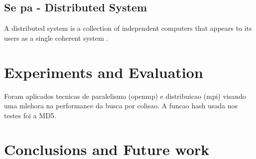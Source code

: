 \documentclass[12pt]{article}
\begin{document}
\subsection{Se pa - Distributed System}
A distributed system is a collection of independent computers that appears to its users as a single 
coherent system \cite{tanenbaum2002distributed}.

\iffalse
\subsection{Message Integrity}

Message integrity is normally maintained via the protocol called “MAC" or Message Authentication Code. 
To briefly explain its mechanism,

In the digital world, the techniques for transmission and integrity assurance of messages are in constant
evolution, aiming more efficient and secure protocols. A protocol's security can be threatened by inumerous
different ways, some possibly unknown yet, and requires a reasonable time of study, tests and attacks
to be considered for use in real applications.

O protocolo de autenticacao HMAC pode ser entendido em detalhes em \cite{krawczyk1997hmac}, mas como uma breve
introducao, consideremos o seguinte exemplo: Alice deseja se comunicar com Bob, a integridade deve ser
mantida, ou seja, the message should not be tampered with or changed to contain false or modified information:
\begin{enumerate}
\item Alice gera uma signing tag \(S(k, m)\), for \(m\) = message and \(k\) = secret key between Alice and Bob
\item Bob ao receber a mensagem, runs a verification algorithm, defined by \(V(k, m, tag) = V(k, m, S(k, m))\)
\item Using the same key, the algorithm will return \(yes\) which shows that message integrity has been mantained
\end{enumerate}

In that way, Bob is able to identify that the message sent by Alice was not compromised and its content
is exactly what Alice had written.

\fi

\section{Experiments and Evaluation}

Foram aplicados tecnicas de paralelismo (openmp) e distribuicao (mpi) visando uma mlehora na performance
da busca por colisao. A funcao hash usada nos testes foi a MD5.

\section{Conclusions and Future work}



\end{document}
